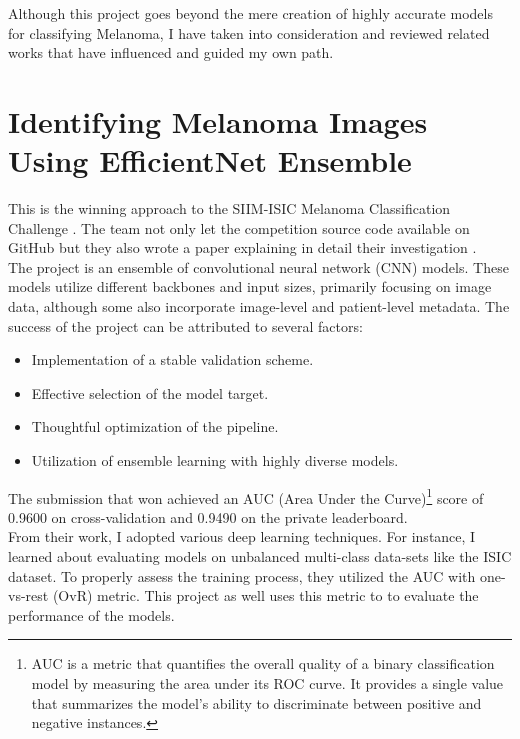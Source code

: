 Although this project goes beyond the mere creation of highly accurate models for classifying Melanoma, I have taken into consideration and reviewed related works that have influenced and guided my own path.

\section{Identifying Melanoma Images Using EfficientNet Ensemble}

This is the winning approach to the SIIM-ISIC Melanoma Classification Challenge \cite{ISICKaggle}. The team not only let the competition source code available on GitHub \cite{WinningISICGithub} but they also wrote a paper explaining in detail their investigation \cite{WinningISIC}. \\

The project is an ensemble of convolutional neural network (CNN) models. These models utilize different backbones and input sizes, primarily focusing on image data, although some also incorporate image-level and patient-level metadata. The success of the project can be attributed to several factors:

\begin{itemize}
    \item Implementation of a stable validation scheme.
    \item Effective selection of the model target.
    \item Thoughtful optimization of the pipeline.
    \item Utilization of ensemble learning with highly diverse models.
\end{itemize}

The submission that won achieved an AUC (Area Under the Curve)\footnote{AUC is a metric that quantifies the overall quality of a binary classification model by measuring the area under its ROC curve. It provides a single value that summarizes the model's ability to discriminate between positive and negative instances.} score of 0.9600 on cross-validation and 0.9490 on the private leaderboard. \\

From their work, I adopted various deep learning techniques. For instance, I learned about evaluating models on unbalanced multi-class data-sets like the ISIC dataset. To properly assess the training process, they utilized the AUC with one-vs-rest (OvR) metric. This project as well uses this metric to to evaluate the performance of the models. \\

